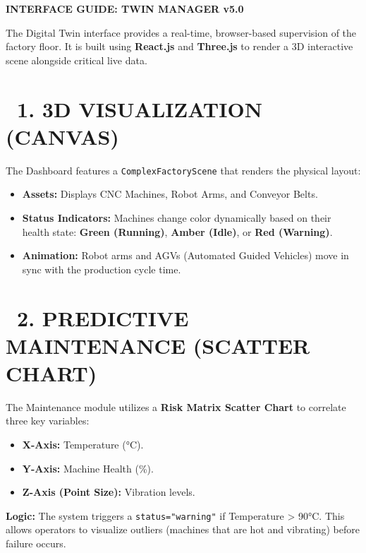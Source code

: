\documentclass[11pt,a4paper]{article}
\begin{document}
\textbf{INTERFACE GUIDE: TWIN MANAGER v5.0}
\par
The Digital Twin interface provides a real-time, browser-based supervision of the factory floor. It is built using \textbf{React.js} and \textbf{Three.js} to render a 3D interactive scene alongside critical live data.

\vspace{0.5cm}

\section*{\faDesktop\ 1. 3D VISUALIZATION (CANVAS)}
The Dashboard features a \texttt{ComplexFactoryScene} that renders the physical layout:
\begin{itemize}
    \item \textbf{Assets:} Displays CNC Machines, Robot Arms, and Conveyor Belts.
    \item \textbf{Status Indicators:} Machines change color dynamically based on their health state: 
    \textcolor{BrandSuccess}{\textbf{Green (Running)}}, \textcolor{BrandWarning}{\textbf{Amber (Idle)}}, or \textcolor{BrandDanger}{\textbf{Red (Warning)}}.
    \item \textbf{Animation:} Robot arms and AGVs (Automated Guided Vehicles) move in sync with the production cycle time.
\end{itemize}

\vspace{0.5cm}

\section*{\faChartLine\ 2. PREDICTIVE MAINTENANCE (SCATTER CHART)}
The Maintenance module utilizes a \textbf{Risk Matrix Scatter Chart} to correlate three key variables:
\begin{itemize}
    \item \textbf{X-Axis:} Temperature (°C).
    \item \textbf{Y-Axis:} Machine Health (\%).
    \item \textbf{Z-Axis (Point Size):} Vibration levels.
\end{itemize}
\textbf{Logic:} The system triggers a \texttt{status="warning"} if Temperature > 90°C. This allows operators to visualize outliers (machines that are hot and vibrating) before failure occurs.

\vspace{0.5cm}
\end{document}
